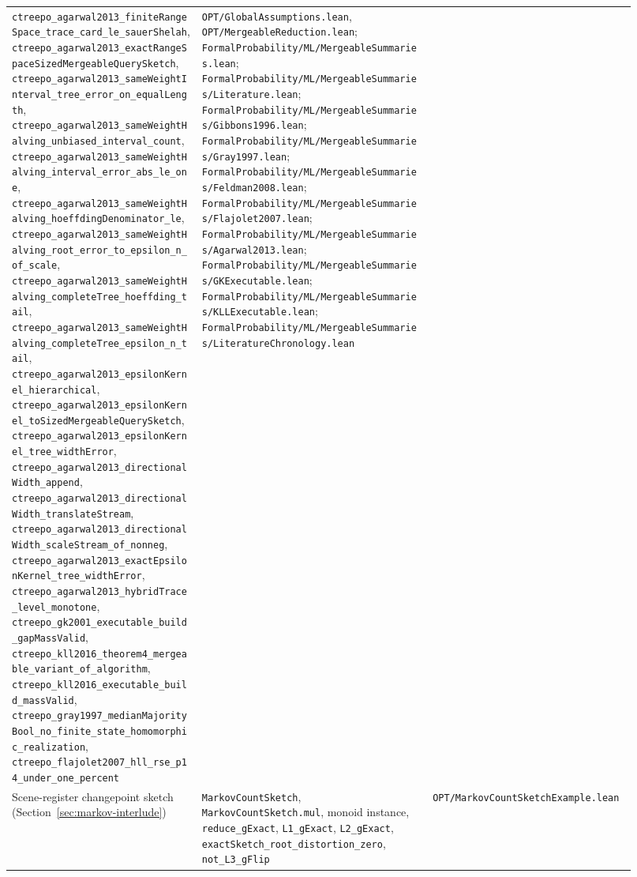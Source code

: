 {\begin{longtable}{p{0.28\linewidth}p{0.34\linewidth}p{0.30\linewidth}}
\nolinkurl{ctreepo_agarwal2013_finiteRangeSpace_trace_card_le_sauerShelah},
\nolinkurl{ctreepo_agarwal2013_exactRangeSpaceSizedMergeableQuerySketch},
\nolinkurl{ctreepo_agarwal2013_sameWeightInterval_tree_error_on_equalLength},
\nolinkurl{ctreepo_agarwal2013_sameWeightHalving_unbiased_interval_count},
\nolinkurl{ctreepo_agarwal2013_sameWeightHalving_interval_error_abs_le_one},
\nolinkurl{ctreepo_agarwal2013_sameWeightHalving_hoeffdingDenominator_le},
\nolinkurl{ctreepo_agarwal2013_sameWeightHalving_root_error_to_epsilon_n_of_scale},
\nolinkurl{ctreepo_agarwal2013_sameWeightHalving_completeTree_hoeffding_tail},
\nolinkurl{ctreepo_agarwal2013_sameWeightHalving_completeTree_epsilon_n_tail},
\texttt{ctreepo\_agarwal2013\_epsilonKernel\_hierarchical},
\nolinkurl{ctreepo_agarwal2013_epsilonKernel_toSizedMergeableQuerySketch},
\nolinkurl{ctreepo_agarwal2013_epsilonKernel_tree_widthError},
\nolinkurl{ctreepo_agarwal2013_directionalWidth_append},
\nolinkurl{ctreepo_agarwal2013_directionalWidth_translateStream},
\nolinkurl{ctreepo_agarwal2013_directionalWidth_scaleStream_of_nonneg},
\nolinkurl{ctreepo_agarwal2013_exactEpsilonKernel_tree_widthError},
\texttt{ctreepo\_agarwal2013\_hybridTrace\_level\_monotone},
\texttt{ctreepo\_gk2001\_executable\_build\_gapMassValid},
\texttt{ctreepo\_kll2016\_theorem4\_mergeable\_variant\_of\_algorithm},
\texttt{ctreepo\_kll2016\_executable\_build\_massValid},
\texttt{ctreepo\_gray1997\_medianMajorityBool\_no\_finite\_state\_homomorphic\_realization},
\texttt{ctreepo\_flajolet2007\_hll\_rse\_p14\_under\_one\_percent} &
\texttt{OPT/GlobalAssumptions.lean}, \texttt{OPT/MergeableReduction.lean};
\texttt{FormalProbability/ML/MergeableSummaries.lean};
\texttt{FormalProbability/ML/MergeableSummaries/Literature.lean};
\texttt{FormalProbability/ML/MergeableSummaries/Gibbons1996.lean};
\texttt{FormalProbability/ML/MergeableSummaries/Gray1997.lean};
\texttt{FormalProbability/ML/MergeableSummaries/Feldman2008.lean};
\texttt{FormalProbability/ML/MergeableSummaries/Flajolet2007.lean};
\texttt{FormalProbability/ML/MergeableSummaries/Agarwal2013.lean};
\texttt{FormalProbability/ML/MergeableSummaries/GKExecutable.lean};
\texttt{FormalProbability/ML/MergeableSummaries/KLLExecutable.lean};
\texttt{FormalProbability/ML/MergeableSummaries/LiteratureChronology.lean} \\

Scene-register changepoint sketch (Section~\ref{sec:markov-interlude}) &
\texttt{MarkovCountSketch}, \texttt{MarkovCountSketch.mul}, monoid instance,
\texttt{reduce\_gExact}, \texttt{L1\_gExact}, \texttt{L2\_gExact},
\texttt{exactSketch\_root\_distortion\_zero}, \texttt{not\_L3\_gFlip} &
\texttt{OPT/MarkovCountSketchExample.lean} \\


\end{longtable}}
